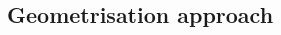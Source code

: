 \documentclass[a0,portrait]{a0poster}
\begin{document}
\begin{multicols}{3}
\vfill\null
\columnbreak
\section{Geometrisation approach}

%
%
%
%
%
%
%


\end{multicols}
\end{document}
